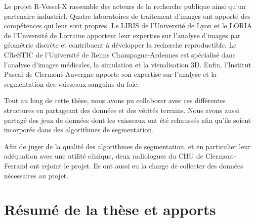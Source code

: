 Le projet R-Vessel-X rassemble des acteurs de la recherche publique ainsi qu'un partenaire industriel. Quatre laboratoires de traitement d'images ont apporté des compétences qui leur sont propres. Le LIRIS de l'Université de Lyon et le LORIA de l'Université de Lorraine apportent leur expertise sur l'analyse d'images par géométrie discrète et contribuent à développer la recherche reproductible. Le CReSTIC de l'Université de Reims Champagne-Ardennes est spécialisé dans l'analyse d'images médicales, la simulation et la visualisation 3D. Enfin, l'Institut Pascal de Clermont-Auvergne apporte son expertise sur l'analyse et la segmentation des vaisseaux sanguins du foie. 

Tout au long de cette thèse, nous avons pu collaborer avec ces différentes structures en partageant des données et des vérités terrains. Nous avons aussi partagé des jeux de données dont les vaisseaux ont été rehaussés afin qu'ils soient incorporés dans des algorithmes de segmentation.

Afin de juger de la qualité des algorithmes de segmentation, et en particulier leur adéquation avec une utilité clinique, deux radiologues du CHU de Clermont-Ferrand ont rejoint le projet. Ils ont aussi eu la charge de collecter des données nécessaires au projet.




\section{Résumé de la thèse et apports}
\label{sec:introduction:résumé}


